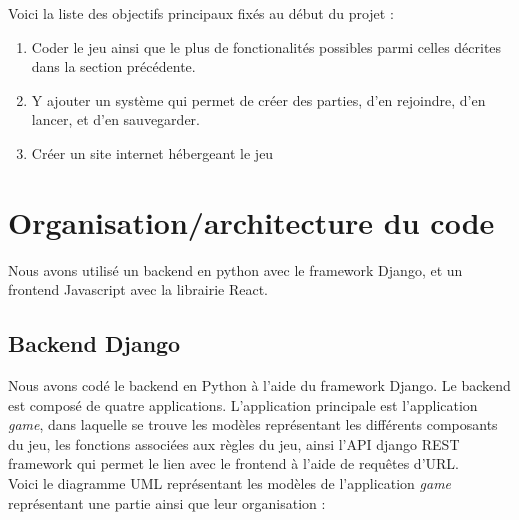 \documentclass[12pt,twoside,a4paper]{article}
\begin{document}
\noindent Voici la liste des objectifs principaux fix\'es au d\'ebut du projet :

\begin{enumerate}
\item Coder le jeu ainsi que le plus de fonctionalit\'es possibles parmi celles d\'ecrites dans la section pr\'ec\'edente.
\item Y ajouter un syst\`eme qui permet de cr\'eer des parties, d'en rejoindre, d'en lancer, et d'en sauvegarder. 
\item Cr\'eer un site internet h\'ebergeant le jeu
\end{enumerate}

\section{Organisation/architecture du code}

Nous avons utilis\'e un backend en python avec le framework Django, et un frontend Javascript avec la librairie React.

\subsection{Backend Django}

Nous avons cod\'e le backend en Python \`a l'aide du framework Django. Le backend est compos\'e de quatre applications. L'application principale est l'application \textit{game}, dans laquelle se trouve les mod\`eles repr\'esentant les diff\'erents composants du jeu,  les fonctions associ\'ees aux r\`egles du jeu, ainsi l'API django REST framework qui permet le lien avec le frontend \`a l'aide de requ\^etes d'URL.\\

Voici le diagramme UML repr\'esentant les mod\`eles de l'application \textit{game} repr\'esentant une partie ainsi que leur organisation :
\end{document}
